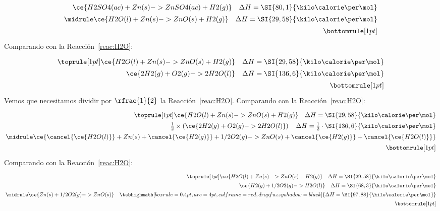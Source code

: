 \begin{frame}
{\begin{overprint}
\[\begin{array}{rl}
								\ce{H2SO4(ac) + Zn(s) -> ZnSO4(ac) + H2(g)}\quad\Delta H=\SI{80,1}{\kilo\calorie\per\mol}\\
							\midrule
								\ce{H2O(l) + Zn(s) -> ZnO(s) + H2(g)}\quad\Delta H=\SI{29,58}{\kilo\calorie\per\mol}\\
							\bottomrule[1pt]
						\end{array}
					\]
			\onslide<4>
				\centering Comparando con la Reacción~\ref{reac:H2O}:
					\[\renewcommand\arraystretch{1.4}
						\arraycolsep=1.4pt
							\begin{array}{rl}\toprule[1pt]
								\ce{H2O(l) + Zn(s) -> ZnO(s) + H2(g)}\quad\Delta H=\SI{29,58}{\kilo\calorie\per\mol}\\
								\ce{2H2(g) + O2(g) -> 2H2O(l)}\quad\Delta H=\SI{136,6}{\kilo\calorie\per\mol}\\
							\bottomrule[1pt]
						\end{array}
					\]
				\centering Vemos que necesitamos dividir por $\rfrac{1}{2}$ la Reacción~\ref{reac:H2O}.
			\onslide<5>
				\centering Comparando con la Reacción~\ref{reac:H2O}:
					\[\renewcommand\arraystretch{1.4}
						\arraycolsep=1.4pt
						\begin{array}{rl}
							\toprule[1pt]
								\ce{H2O(l) + Zn(s) -> ZnO(s) + H2(g)}\quad\Delta H=\SI{29,58}{\kilo\calorie\per\mol}\\
								\frac{1}{2}\times\left(\ce{2H2(g) + O2(g) -> 2H2O(l)}\right)\quad\Delta H=\frac{1}{2}\cdot\SI{136,6}{\kilo\calorie\per\mol}\\
							\midrule
								\ce{\cancel{\ce{H2O(l)}} + Zn(s) + \cancel{\ce{H2(g)}} + 1/2O2(g) -> ZnO(s) + \cancel{\ce{H2(g)}} + \cancel{\ce{H2O(l)}}}\\
							\bottomrule[1pt]
						\end{array}
					\]
			\onslide<6->
				\centering Comparando con la Reacción~\ref{reac:H2O}:
					\[\renewcommand\arraystretch{1.4}
						\arraycolsep=1.4pt
						\begin{array}{rl}
							\toprule[1pt]
								\ce{H2O(l) + Zn(s) -> ZnO(s) + H2(g)}\quad\Delta H=\SI{29,58}{\kilo\calorie\per\mol}\\
								\ce{H2(g) + 1/2O2(g) -> H2O(l)}\quad\Delta H=\SI{68,3}{\kilo\calorie\per\mol}\\
							\midrule
								\ce{Zn(s) + 1/2O2(g) -> ZnO(s)}\quad\tcbhighmath[boxrule=0.4pt,arc=4pt,colframe=red,drop fuzzy shadow=black]{\Delta H=\SI{97,88}{\kilo\calorie\per\mol}}\\
							\bottomrule[1pt]
						\end{array}
					\]
		\end{overprint}
				}
\end{frame}
